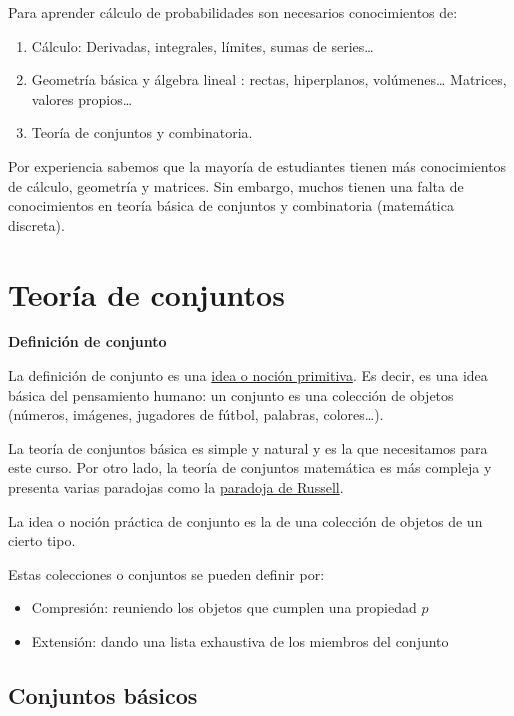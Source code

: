 \documentclass[]{book}
\providecommand{\tightlist}{%
  \setlength{\itemsep}{0pt}\setlength{\parskip}{0pt}}
\begin{document}
Para aprender cálculo de probabilidades son necesarios conocimientos de:

\begin{enumerate}
\def\labelenumi{\arabic{enumi}.}
\tightlist
\item
  Cálculo: Derivadas, integrales, límites, sumas de series\ldots{}
\item
  Geometría básica y álgebra lineal : rectas, hiperplanos, volúmenes\ldots{} Matrices, valores propios\ldots{}
\item
  Teoría de conjuntos y combinatoria.
\end{enumerate}

Por experiencia sabemos que la mayoría de estudiantes tienen más conocimientos de cálculo, geometría y matrices. Sin embargo, muchos tienen una falta de conocimientos en teoría básica de conjuntos y combinatoria (matemática discreta).

\hypertarget{teoruxeda-de-conjuntos}{%
\section{Teoría de conjuntos}\label{teoruxeda-de-conjuntos}}

 \textbf{Definición de conjunto}

La definición de conjunto es una \href{https://es.wikipedia.org/wiki/Concepto_primitivo}{idea o noción primitiva}. Es decir, es una idea básica del pensamiento humano: un conjunto es una colección de objetos (números, imágenes, jugadores de fútbol, palabras, colores\ldots{}).

La teoría de conjuntos básica es simple y natural y es la que necesitamos para este curso. Por otro lado, la teoría de conjuntos matemática es más compleja y presenta varias paradojas como la \href{https://es.wikipedia.org/wiki/Paradoja_de_Russell}{paradoja de Russell}.

La idea o noción práctica de conjunto es la de una colección de objetos de un cierto tipo.

Estas colecciones o conjuntos se pueden definir por:

\begin{itemize}
\tightlist
\item
  Compresión: reuniendo los objetos que cumplen una propiedad \(p\)
\item
  Extensión: dando una lista exhaustiva de los miembros del conjunto
\end{itemize}

\hypertarget{conjuntos-buxe1sicos}{%
\subsection{Conjuntos básicos}\label{conjuntos-buxe1sicos}}
\end{document}
